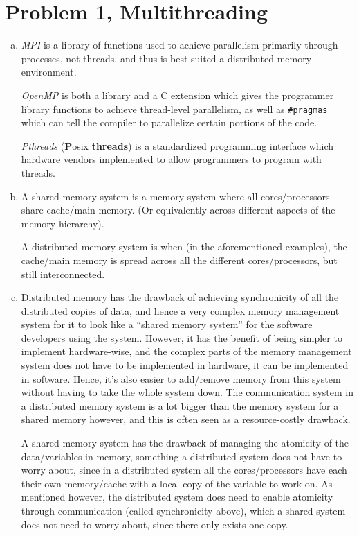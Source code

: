 \documentclass[fontsize=11pt, paper=a4, titlepage]{article}
\begin{document}
\section{Problem 1, Multithreading}
\begin{enumerate}[a)]

    \item \textit{MPI} is a library of functions used to achieve parallelism
primarily through processes, not threads, and thus is best suited a distributed
memory environment.

\textit{OpenMP} is both a library and a C extension which gives the programmer
library functions to achieve thread-level parallelism, as well as
\lstinline!#pragmas! which can tell the compiler to parallelize certain portions
of the code.

\textit{Pthreads} (\textbf{P}osix \textbf{threads}) is a standardized
programming interface which hardware vendors implemented to allow programmers to
program with threads.

    \item A shared memory system is a memory system where all cores/processors
share cache/main memory. (Or equivalently across different aspects of the memory
hierarchy).

A distributed memory system is when (in the aforementioned examples), the
cache/main memory is spread across all the different cores/processors, but still
interconnected.

    \item Distributed memory has the drawback of achieving synchronicity of all
the distributed copies of data, and hence a very complex memory management
system for it to look like a ``shared memory system'' for the software
developers using the system. However, it has the benefit of being simpler to
implement hardware-wise, and the complex parts of the memory management system
does not have to be implemented in hardware, it can be implemented in software.
Hence, it's also easier to add/remove memory from this system without having to
take the whole system down. The communication system in a distributed memory
system is a lot bigger than the memory system for a shared memory however, and
this is often seen as a resource-costly drawback.

A shared memory system has the drawback of managing the atomicity of the
data/variables in memory, something a distributed system does not have to worry
about, since in a distributed system all the cores/processors have each their
own memory/cache with a local copy of the variable to work on. As mentioned
however, the distributed system does need to enable atomicity through
communication (called synchronicity above), which a shared system does not need
to worry about, since there only exists one copy.


\end{enumerate}
\end{document}
